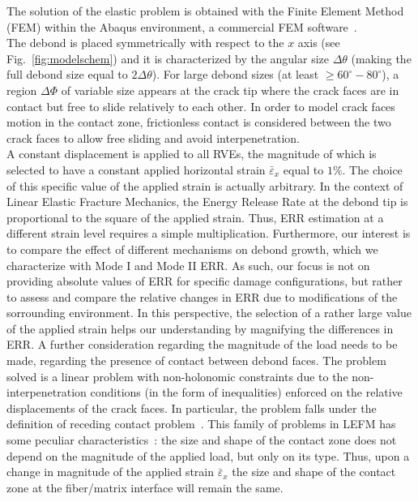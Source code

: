 \documentclass[smallextended]{svjour3}       %
\begin{document}
The solution of the elastic problem is obtained with the Finite Element Method (FEM) within the Abaqus environment, a commercial FEM software~\cite{abq12}.\\
The debond is placed symmetrically with respect to the $x$ axis (see Fig.~\ref{fig:modelschem}) and it is characterized by the angular size $\Delta\theta$ (making the full debond size equal to $2\Delta\theta$). For large debond sizes (at least $\geq 60^{\circ}-80^{\circ}$), a region $\Delta\Phi$ of variable size appears at the crack tip where the crack faces are in contact but free to slide relatively to each other. In order to model crack faces motion in the contact zone, frictionless contact is considered between the two crack faces to allow free sliding and avoid interpenetration.\\
A constant displacement is applied to all RVEs, the magnitude of which is selected to have a constant applied horizontal strain $\bar{\varepsilon}_{x}$ equal to $1\%$. The choice of this specific value of the applied strain is actually arbitrary. In the context of Linear Elastic Fracture Mechanics, the Energy Release Rate at the debond tip is proportional to the square of the applied strain. Thus, ERR estimation at a different strain level requires a simple multiplication. Furthermore, our interest is to compare the effect of different mechanisms on debond growth, which we characterize with Mode I and Mode II ERR. As such, our focus is not on providing absolute values of ERR for specific damage configurations, but rather to assess and compare the relative changes in ERR due to modifications of the sorrounding environment. In this perspective, the selection of a rather large value of the applied strain helps our understanding by magnifying the differences in ERR. A further consideration regarding the magnitude of the load needs to be made, regarding the presence of contact between debond faces. The problem solved is a linear problem with non-holonomic constraints due to the non-interpenetration conditions (in the form of inequalities) enforced on the relative displacements of the crack faces. In particular, the problem falls under the definition of receding contact problem~\cite{Paris1996,Garrido1991}. This family of problems in LEFM has some peculiar characteristics~\cite{Garrido1991,Keer1972,Tsai1974}: the size and shape of the contact zone does not depend on the magnitude of the applied load, but only on its type. Thus, upon a change in magnitude of the applied strain $\bar{\varepsilon}_{x}$ the size and shape of the contact zone at the fiber/matrix interface will remain the same.\\
\end{document}
